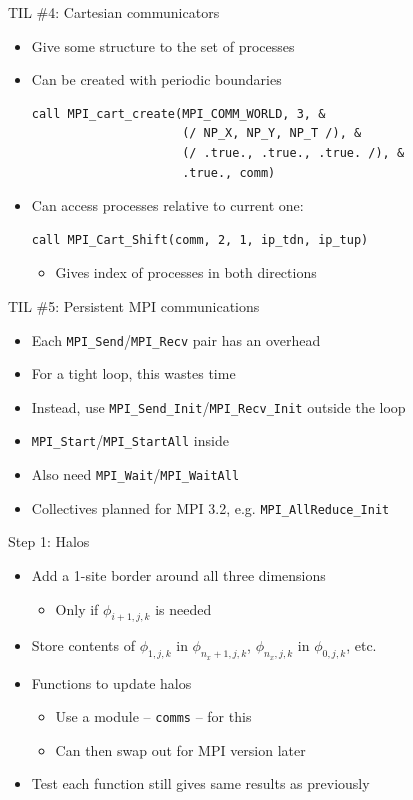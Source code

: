 \documentclass[handout]{beamer}
\begin{document}
\begin{frame}[fragile]{TIL \#4: Cartesian communicators}
	\begin{itemize}[<+->]
		\item Give some structure to the set of processes
		\item Can be created with periodic boundaries
		\begin{verbatim}
call MPI_cart_create(MPI_COMM_WORLD, 3, &
                     (/ NP_X, NP_Y, NP_T /), &
                     (/ .true., .true., .true. /), &
                     .true., comm)\end{verbatim}
		\item Can access processes relative to current one:
		\begin{verbatim}call MPI_Cart_Shift(comm, 2, 1, ip_tdn, ip_tup)\end{verbatim}
		\begin{itemize}[<+->]
			\item Gives index of processes in both directions
		\end{itemize}
	\end{itemize}
\end{frame}

\begin{frame}[fragile]{TIL \#5: Persistent MPI communications}
	\begin{itemize}[<+->]
		\item Each \verb|MPI_Send|/\verb|MPI_Recv| pair has an overhead
		\item For a tight loop, this wastes time
		\item Instead, use \verb|MPI_Send_Init|/\verb|MPI_Recv_Init| outside the loop
		\item \verb|MPI_Start|/\verb|MPI_StartAll| inside
		\item Also need \verb|MPI_Wait|/\verb|MPI_WaitAll|
		\item Collectives planned for MPI 3.2, e.g. \verb|MPI_AllReduce_Init|
	\end{itemize}
\end{frame}

\begin{frame}{Step 1: Halos}
	\begin{itemize}[<+->]
		\item Add a 1-site border around all three dimensions
		\begin{itemize}[<+->]
			\item Only if $\phi_{i+1,j,k}$ is needed
		\end{itemize}
		\item Store contents of $\phi_{1,j,k}$ in $\phi_{n_x+1,j,k}$, $\phi_{n_x,j,k}$ in $\phi_{0,j,k}$, etc.
		\item Functions to update halos
		\begin{itemize}[<+->]
			\item Use a module -- \texttt{comms} -- for this
			\item Can then swap out for MPI version later
		\end{itemize}
		\item Test each function still gives same results as previously
	\end{itemize}
\end{frame}
\end{document}
